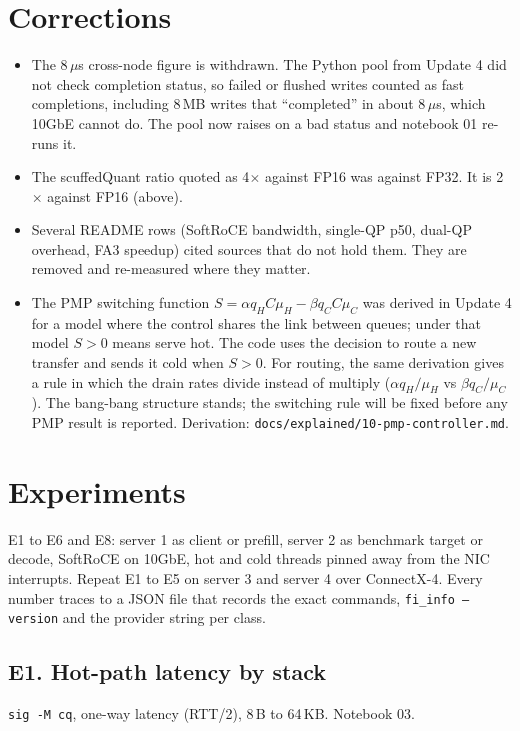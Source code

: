 \documentclass[11pt,letterpaper]{article}
\begin{document}
\section{Corrections}

\begin{itemize}
\item The 8\,$\mu$s cross-node figure is withdrawn. The Python pool from Update 4 did not check completion status, so failed or flushed writes counted as fast completions, including 8\,MB writes that ``completed'' in about 8\,$\mu$s, which 10GbE cannot do. The pool now raises on a bad status and notebook 01 re-runs it.
\item The scuffedQuant ratio quoted as 4$\times$ against FP16 was against FP32. It is 2$\times$ against FP16 (above).
\item Several README rows (SoftRoCE bandwidth, single-QP p50, dual-QP overhead, FA3 speedup) cited sources that do not hold them. They are removed and re-measured where they matter.
\item The PMP switching function $S = \alpha q_H C\mu_H - \beta q_C C\mu_C$ was derived in Update 4 for a model where the control shares the link between queues; under that model $S > 0$ means serve hot. The code uses the decision to route a new transfer and sends it cold when $S > 0$. For routing, the same derivation gives a rule in which the drain rates divide instead of multiply ($\alpha q_H/\mu_H$ vs $\beta q_C/\mu_C$). The bang-bang structure stands; the switching rule will be fixed before any PMP result is reported. Derivation: \nolinkurl{docs/explained/10-pmp-controller.md}.
\end{itemize}

\section{Experiments}
\label{sec:exp}

E1 to E6 and E8: server 1 as client or prefill, server 2 as benchmark target or decode, SoftRoCE on 10GbE, hot and cold threads pinned away from the NIC interrupts. Repeat E1 to E5 on server 3 and server 4 over ConnectX-4. Every number traces to a JSON file that records the exact commands, \texttt{fi\_info --version} and the provider string per class.

\subsection{E1. Hot-path latency by stack}
\texttt{sig -M cq}, one-way latency (RTT/2), 8\,B to 64\,KB. Notebook 03.
\end{document}
